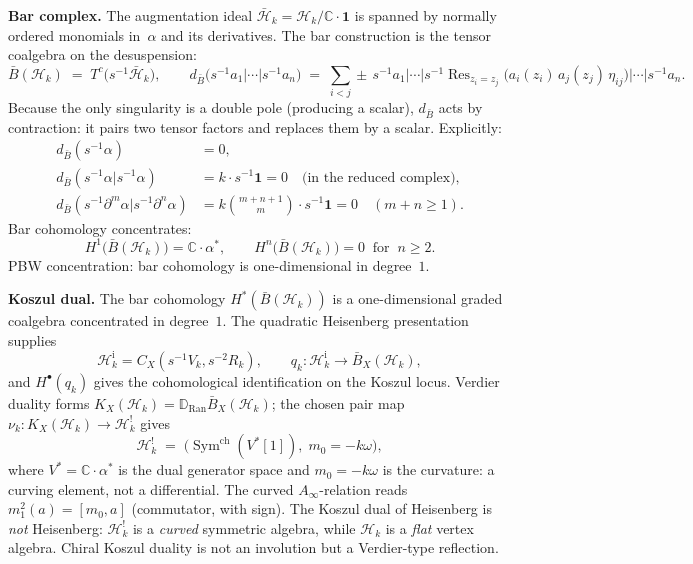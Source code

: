 \documentclass[11pt]{report}
\theoremstyle{definition}
\theoremstyle{remark}
\providecommand{\barB}{\bar{B}}
\providecommand{\Ran}{\mathrm{Ran}}
\numberwithin{equation}{section}
\begin{document}
\medskip
\noindent\textbf{Bar complex.}
The augmentation ideal
$\bar{\mathcal H}_k=\mathcal H_k/\mathbb C\cdot\mathbf{1}$ is
spanned by normally ordered monomials in~$\alpha$ and its
derivatives. The bar construction is the tensor coalgebra on the
desuspension:
\[
\barB(\mathcal H_k)
\;=\;
T^c\!\bigl(s^{-1}\bar{\mathcal H}_k\bigr),
\qquad
d_{\barB}\bigl(s^{-1}a_1|\cdots|s^{-1}a_n\bigr)
\;=\;
\sum_{i<j}\pm\,
s^{-1}a_1|\cdots|s^{-1}\operatorname{Res}_{z_i=z_j}
\bigl(a_i(z_i)\,a_j(z_j)\,\eta_{ij}\bigr)|\cdots|s^{-1}a_n.
\]
Because the only singularity is a double pole (producing a scalar),
$d_{\barB}$ acts by contraction: it pairs two tensor factors and
replaces them by a scalar. Explicitly:
\begin{align*}
d_{\barB}(s^{-1}\alpha) &= 0,\\
d_{\barB}(s^{-1}\alpha|s^{-1}\alpha) &=
 k\cdot s^{-1}\mathbf{1} = 0 \quad
 \text{(in the reduced complex)},\\
d_{\barB}(s^{-1}\partial^m\alpha|s^{-1}\partial^n\alpha) &=
 k\binom{m+n+1}{m}\cdot s^{-1}\mathbf{1} = 0 \quad (m+n\ge 1).
\end{align*}
Bar cohomology concentrates:
\[
H^1\bigl(\barB(\mathcal H_k)\bigr) = \mathbb C\cdot\alpha^*,
\qquad
H^n\bigl(\barB(\mathcal H_k)\bigr) = 0 \;\;\text{for}\;\; n\ge 2.
\]
PBW concentration: bar cohomology is one-dimensional in degree~$1$.

\medskip
\noindent\textbf{Koszul dual.}
The bar cohomology $H^*(\barB(\mathcal H_k))$ is a one-dimensional
graded coalgebra concentrated in degree~$1$.  The quadratic Heisenberg
presentation supplies
\[
\mathcal H_k^{\mathrm i}=C_X(s^{-1}V_k,s^{-2}R_k),\qquad
q_k\colon\mathcal H_k^{\mathrm i}\longrightarrow\barB_X(\mathcal H_k),
\]
and $H^\bullet(q_k)$ gives the cohomological identification on the
Koszul locus.  Verdier duality forms
$K_X(\mathcal H_k)=\mathbb D_{\Ran}\barB_X(\mathcal H_k)$; the chosen
pair map $\nu_k\colon K_X(\mathcal H_k)\to\mathcal H_k^!$ gives
\[
\mathcal H_k^!
\;=\;
\bigl(\operatorname{Sym}^{\mathrm{ch}}(V^*[1]),\;m_0=-k\omega\bigr),
\]
where $V^*=\mathbb C\cdot\alpha^*$ is the dual generator space and
$m_0=-k\omega$ is the curvature: a curving element, not a
differential. The curved $A_\infty$-relation reads
$m_1^2(a)=[m_0,a]$ (commutator, with sign). The Koszul dual of
Heisenberg is \emph{not} Heisenberg: $\mathcal H_k^!$ is a
\emph{curved} symmetric algebra, while $\mathcal H_k$ is a
\emph{flat} vertex algebra. Chiral
Koszul duality is not an involution but a Verdier-type reflection.
\end{document}
